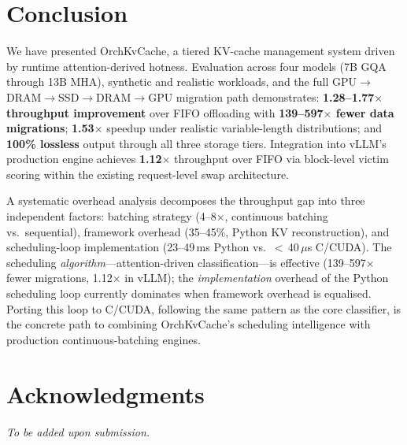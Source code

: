 \documentclass[conference]{IEEEtran}
\begin{document}
\section{Conclusion}

We have presented OrchKvCache, a tiered KV-cache management system driven by runtime attention-derived hotness. Evaluation across four models (7B GQA through 13B MHA), synthetic and realistic workloads, and the full GPU$\to$DRAM$\to$SSD$\to$DRAM$\to$GPU migration path demonstrates: \textbf{1.28--1.77$\times$ throughput improvement} over FIFO offloading with \textbf{139--597$\times$ fewer data migrations}; \textbf{1.53$\times$} speedup under realistic variable-length distributions; and \textbf{100\% lossless} output through all three storage tiers. Integration into vLLM's production engine achieves \textbf{1.12$\times$} throughput over FIFO via block-level victim scoring within the existing request-level swap architecture.

A systematic overhead analysis decomposes the throughput gap into three independent factors: batching strategy (4--8$\times$, continuous batching vs.\ sequential), framework overhead (35--45\%, Python KV reconstruction), and scheduling-loop implementation (23--49\,ms Python vs.\ $<$\,40\,$\mu$s C/CUDA). The scheduling \emph{algorithm}---attention-driven classification---is effective (139--597$\times$ fewer migrations, 1.12$\times$ in vLLM); the \emph{implementation} overhead of the Python scheduling loop currently dominates when framework overhead is equalised. Porting this loop to C/CUDA, following the same pattern as the core classifier, is the concrete path to combining OrchKvCache's scheduling intelligence with production continuous-batching engines.

\section*{Acknowledgments}
\textit{To be added upon submission.}
\end{document}
